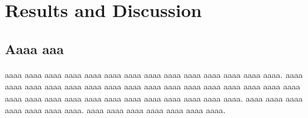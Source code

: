 \documentclass[12pt,openany,english]{jsbook}        %
\begin{document}
%
%
%
\chapter{Results and Discussion}
%
%
%
\section{Aaaa aaa}
%
%
%
\begin{doublespace}
%
aaaa aaaa aaaa aaaa aaaa aaaa aaaa 
aaaa aaaa aaaa aaaa aaaa aaaa aaaa.
aaaa aaaa aaaa aaaa aaaa aaaa aaaa 
aaaa aaaa aaaa aaaa aaaa aaaa aaaa 
aaaa aaaa aaaa aaaa aaaa aaaa aaaa 
aaaa aaaa aaaa aaaa aaaa aaaa aaaa.
aaaa aaaa aaaa aaaa aaaa aaaa aaaa.
aaaa aaaa aaaa aaaa aaaa aaaa aaaa.
%
\end{doublespace}
%
%
%
\end{document}
